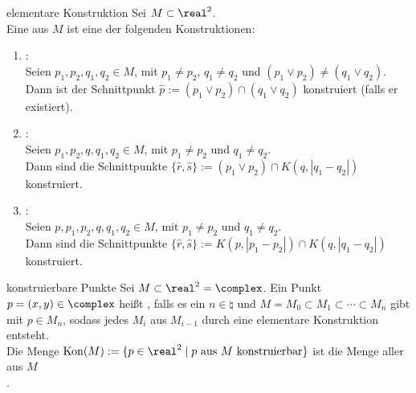 \begin{Def}{elementare Konstruktion}
    Sei $M \subset \real^2$.\\
    Eine  aus $M$ ist eine der folgenden
    Konstruktionen:
    \begin{enumerate}[label=\Roman*.]
        \item
        :\\
        Seien $p_1, p_2, q_1, q_2 \in M$,
        mit $p_1 \not= p_2$, $q_1 \not= q_2$ und
        $(p_1 \lor p_2) \not= (q_1 \lor q_2)$.\\
        Dann ist der Schnittpunkt
        $\widehat{p} := (p_1 \lor p_2) \cap (q_1 \lor q_2)$
        konstruiert (falls er existiert).

        \item
        :\\
        Seien $p_1, p_2, q, q_1, q_2 \in M$,
        mit $p_1 \not= p_2$ und $q_1 \not= q_2$.\\
        Dann sind die Schnittpunkte
        $\{\widehat{r}, \widehat{s}\} := (p_1 \lor p_2) \cap K(q, |q_1 - q_2|)$
        konstruiert.

        \item
        :\\
        Seien $p, p_1, p_2, q, q_1, q_2 \in M$,
        mit $p_1 \not= p_2$ und $q_1 \not= q_2$.\\
        Dann sind die Schnittpunkte
        $\{\widehat{r}, \widehat{s}\} :=
        K(p, |p_1 - p_2|) \cap K(q, |q_1 - q_2|)$
        konstruiert.
    \end{enumerate}
\end{Def}

\begin{Def}{konstruierbare Punkte}
    Sei $M \subset \real^2 = \complex$.
    Ein Punkt $p = (x, y) \in \complex$ heißt
    , falls
    es ein $n \in \natural$ und
    $M = M_0 \subset M_1 \subset \dotsb \subset M_n$
    gibt mit $p \in M_n$, sodass jedes $M_i$ aus $M_{i-1}$ durch eine
    elementare Konstruktion entsteht.\\
    Die Menge $\Kon(M) := \{p \in \real^2 \;|\;
    p \text{ aus } M \text{ konstruierbar}\}$ ist die Menge aller aus $M$\\
    .
\end{Def}

